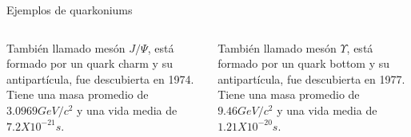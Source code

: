 \begin{frame}{Ejemplos de quarkoniums}

    \begin{columns}
    \begin{column}{0.5\textwidth}
       \begin{tcolorbox}[colback=blue!5!white, colframe =blue!75!black, title= Charmonium]
            También llamado mesón $J / \Psi $, está formado por un quark charm y su antipartícula, fue descubierta en 1974.
            Tiene una masa promedio de  $ 3.0969 GeV/c^2 $ y una vida media de $7.2X10^{-21} s$.
        \end{tcolorbox}
    \end{column}
    \begin{column}{0.5\textwidth}  
        \begin{center}
             \begin{tcolorbox}[colback=blue!5!white, colframe =blue!75!black,title= Bottonium]
                También llamado mesón $ \Upsilon $, está formado por un quark bottom y su antipartícula, fue descubierta en 1977.
                Tiene una masa promedio de  $ 9.46 GeV/c^2 $ y una vida media de $1.21X10^{-20} s$.
            \end{tcolorbox}
         \end{center}
    \end{column}
    \end{columns}
\end{frame}






